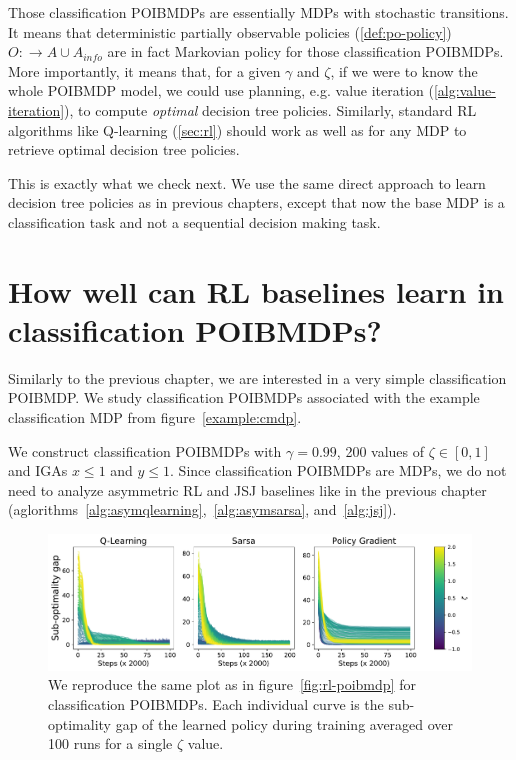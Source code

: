 Those classification POIBMDPs are essentially MDPs with stochastic transitions.
It means that deterministic partially observable policies (\ref{def:po-policy}) $O:\rightarrow A\cup A_{info}$ are in fact Markovian policy for those classification POIBMDPs.
More importantly, it means that, for a given $\gamma$ and $\zeta$, if we were to know the whole POIBMDP model, we could use planning, e.g. value iteration (\ref{alg:value-iteration}), to compute \textit{optimal} decision tree policies.
Similarly, standard RL algorithms like Q-learning (\ref{sec:rl}) should work as well as for any MDP to retrieve optimal decision tree policies.

This is exactly what we check next.
We use the same direct approach to learn decision tree policies as in previous chapters, except that now the base MDP is a classification task and not a sequential decision making task.

\section{How well can RL baselines learn in classification POIBMDPs?}
Similarly to the previous chapter, we are interested in a very simple classification POIBMDP.
We study classification POIBMDPs associated with the example classification MDP from figure~\ref{example:cmdp}.

We construct classification POIBMDPs with $\gamma=0.99$, 200 values of $\zeta \in [0,1]$ and IGAs $x\leq 1$ and $y\leq 1$.
Since classification POIBMDPs are MDPs, we do not need to analyze asymmetric RL and JSJ baselines like in the previous chapter (aglorithms~\ref{alg:asymqlearning},~\ref{alg:asymsarsa}, and~\ref{alg:jsj}).

\begin{figure}
    \centering
    \includegraphics[width=1\textwidth]{images/images_part1/learning_curves_classif.pdf}
    \caption{We reproduce the same plot as in figure~\ref{fig:rl-poibmdp} for classification POIBMDPs. Each individual curve is the sub-optimality gap of the learned policy during training averaged over 100 runs for a single $\zeta$ value.}\label{fig:rl-classif-poibmdp}
\end{figure}

